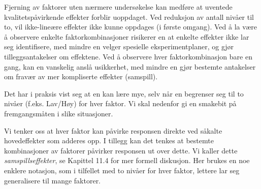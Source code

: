 Fjerning av faktorer uten nærmere undersøkelse kan medføre
at uventede kvalitetspåvirkende effekter forblir uoppdaget.  Ved 
reduksjon av antall nivåer til to, vil ikke-lineære effekter
ikke kunne oppdages (i første omgang).  Ved å la være å
observere enkelte faktorkombinasjoner risikerer en at enkelte effekter
ikke lar seg identifisere, med mindre en velger spesielle 
eksperimentplaner, og gjør tilleggsantakelser om effektene.  Ved å
observere hver faktorkombinasjon bare en gang, kan en vanskelig anslå
usikkerhet, med mindre en gjør bestemte antakelser om fravær av
mer kompliserte effekter (samspill).

Det har i praksis vist seg at en kan lære mye, selv når en 
begrenser seg til to nivåer (f.eks. Lav/Høy) for hver faktor.  Vi
skal nedenfor gi en smakebit på fremgangsmåten i slike situasjoner.

Vi tenker oss at hver faktor kan påvirke responsen direkte ved
såkalte hovedeffekter som adderes opp.  I tillegg kan det tenkes at
bestemte kombinasjoner av faktorer påvirker responsen ut over dette.
Vi kaller dette {\em samspillseffekter}, se Kapittel 11.4 for mer formell
diskusjon.
Her brukes en noe enklere notasjon, som i tilfellet med to nivåer for
hver faktor, lettere lar seg generalisere til mange faktorer.\\

